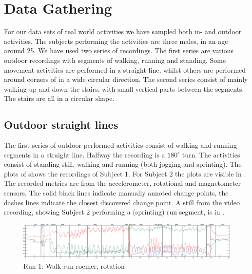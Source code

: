 \section{Data Gathering}\label{sec:data_gathering}
For our data sets of real world activities we have sampled both in- and outdoor activities.
The subjects performing the activities are three males, in an age around 25.
We have used two series of recordings.
The first series are various outdoor recordings with segments of walking, running and standing.
Some movement activities are performed in a straight line, whilst others are performed around corners of in a wide circular direction.
The second series consist of mainly walking up and down the stairs, with small vertical parts between the segments.
The stairs are all in a circular shape.

\subsection{Outdoor straight lines}\label{subsec:outdoor_straight}
The first series of outdoor performed activities consist of walking and running segments in a straight line.
Halfway the recording is a $180^{\circ}$ turn.
The activities consist of standing still, walking and running (both jogging and sprinting).
The plots of  shows the recordings of Subject $1$.
For Subject $2$ the plots are visible in .
The recorded metrics are from the accelerometer, rotational and magnetometer sensors.
The solid black lines indicate manually annoted change points, the dashes lines indicate the closest discovered change point.
A still from the video recording, showing Subject $2$ performing a (sprinting) run segment, is in .


\begin{figure}
\centering
  \includegraphics[width=1\textwidth]{./Figures/chapter6/data_collection/run-1-walk-run-roemer/data_plot_rot_annotated.eps}
  \caption[R1: rotation]{Run 1: Walk-run-roemer, rotation}
  \label{fig:data_gathering_run_1_rot}
\end{figure}

